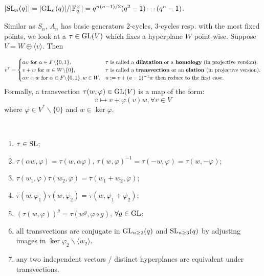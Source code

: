 \documentclass[a4paper,11pt]{article}
\begin{document}
\begin{remark}
    $|\mathrm{SL}_n(q)|=|\mathrm{GL}_n(q)|/|\mathbb{F}_q^\times|=q^{n(n-1)/2}(q^2-1)\cdots(q^n-1)$.
\end{remark}

Similar as $S_n$, $A_n$ has basic generators 2-cycles, 3-cycles resp. with the most fixed points, we look at a $\tau\in \mathrm{GL}(V)$ which fixes a hyperplane $W$ point-wise. Suppose $V=W\oplus\langle v\rangle$. Then 

\begin{definition}
\begin{equation*}
    v^\tau=\begin{cases}
    \alpha v \text{ for }\alpha\in F\backslash\{0,1\}, & \tau\text{ is called a \textbf{dilatation} or a \textbf{homology} (in projective version).}\\
    v+w \text{ for } w\in W\backslash \{0\}, & \tau\text{ is called a \textbf{transvection} or an \textbf{elation} (in projective version).}\\
    \alpha v+w \text{ for }\alpha\in F\backslash\{0,1\}, w\in W, & u:=v+(a-1)^{-1}w \text{ then reduce to the first case.}
    \end{cases}
\end{equation*}
Formally, a transvection $\tau(w,\varphi)\in\mathrm{GL}(V)$ is a map of the form:
\[ v\mapsto v+\varphi(v)w, \forall v\in V \] where $\varphi\in V^*\backslash \{0\}$ and $w\in\ker \varphi$.
\end{definition}

\begin{lemma}\ 
    \begin{enumerate}
        \item $\tau\in \mathrm{SL}$;
        \item $\tau(\alpha w,\varphi)=\tau(w,\alpha\varphi)$, $\tau(w,\varphi)^{-1}=\tau(-w,\varphi)=\tau(w,-\varphi) $;
        \item $\tau(w_1,\varphi)\tau(w_2,\varphi)=\tau(w_1+w_2,\varphi)$;
        \item $\tau(w,\varphi_1)\tau(w,\varphi_2)=\tau(w,\varphi_1+\varphi_2)$;
        \item $(\tau(w,\varphi))^g=\tau(w^g,\varphi\circ g)$, $\forall g\in \mathrm{GL}$;
        \item all transvections are conjugate in $\mathrm{GL}_{n\geq 2}(q)$ and $\mathrm{SL}_{n\geq 3}(q)$ by adjusting images in $\ker\varphi_2\backslash\langle w_2\rangle$.
        \item any two independent vectors / distinct hyperplanes are equivalent under transvections.
    \end{enumerate}
\end{lemma}
\end{document}
